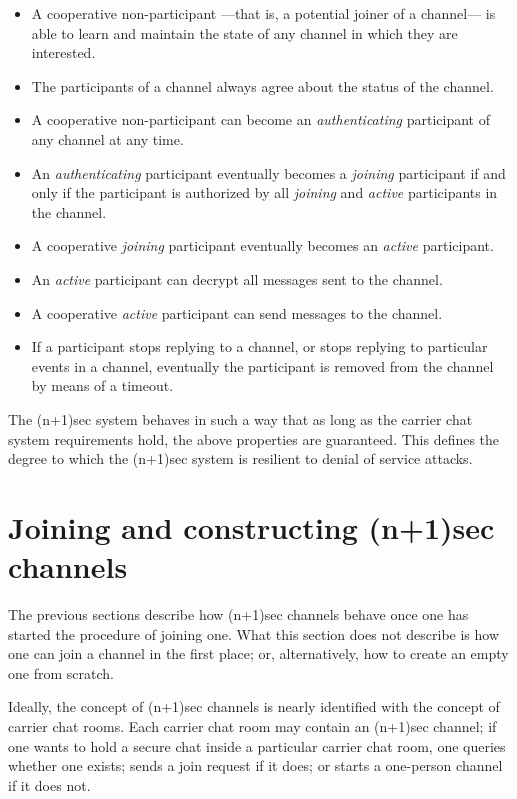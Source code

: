 \documentclass{article}
\begin{document}
\begin{itemize}
\item A cooperative non-participant ---that is, a potential joiner of a channel--- is able to learn and maintain the state of any channel in which they are interested.
\item The participants of a channel always agree about the status of the channel.
\item A cooperative non-participant can become an \emph{authenticating} participant of any channel at any time.
\item An \emph{authenticating} participant eventually becomes a \emph{joining} participant if and only if the participant is authorized by all \emph{joining} and \emph{active} participants in the channel.
\item A cooperative \emph{joining} participant eventually becomes an \emph{active} participant.
\item An \emph{active} participant can decrypt all messages sent to the channel.
\item A cooperative \emph{active} participant can send messages to the channel.
\item If a participant stops replying to a channel, or stops replying to particular events in a channel, eventually the participant is removed from the channel by means of a timeout.
\end{itemize}

The (n+1)sec system behaves in such a way that as long as the carrier chat system requirements hold, the above properties are guaranteed.
This defines the degree to which the (n+1)sec system is resilient to denial of service attacks.

\section{Joining and constructing (n+1)sec channels}
\label{sec:joining-and-constructing-np1sec-channels}

The previous sections describe how (n+1)sec channels behave once one has started the procedure of joining one.
What this section does not describe is how one can join a channel in the first place; or, alternatively, how to create an empty one from scratch.

Ideally, the concept of (n+1)sec channels is nearly identified with the concept of carrier chat rooms.
Each carrier chat room may contain an (n+1)sec channel; if one wants to hold a secure chat inside a particular carrier chat room, one queries whether one exists; sends a join request if it does; or starts a one-person channel if it does not.
\end{document}
